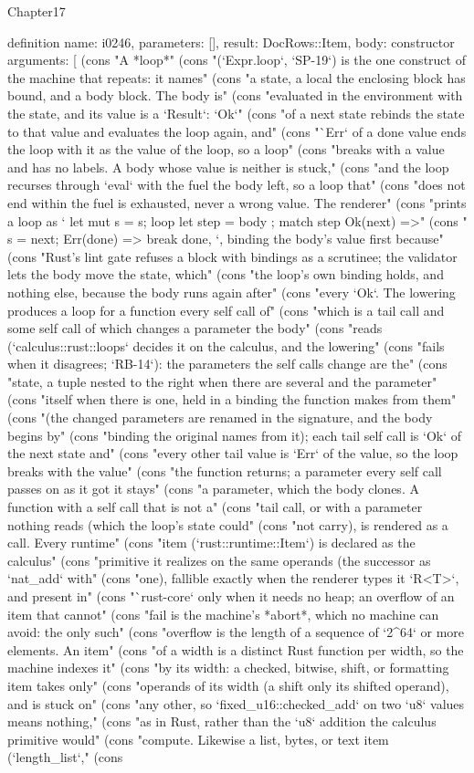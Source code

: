 \begin{lexlean}{Chapter17}
\begin{semanticmodule}
definition{
  name: i0246,
  parameters: [],
  result: DocRows::Item,
  body: constructor{
    arguments: [
      (cons "A *loop*" (cons "(`Expr.loop`, `SP-19`) is the one construct of the machine that repeats: it names" (cons "a state, a local the enclosing block has bound, and a body block. The body is" (cons "evaluated in the environment with the state, and its value is a `Result`: `Ok`" (cons "of a next state rebinds the state to that value and evaluates the loop again, and" (cons "`Err` of a done value ends the loop with it as the value of the loop, so a loop" (cons "breaks with a value and has no labels. A body whose value is neither is stuck," (cons "and the loop recurses through `eval` with the fuel the body left, so a loop that" (cons "does not end within the fuel is exhausted, never a wrong value. The renderer" (cons "prints a loop as `{ let mut s = s; loop { let step = { body }; match step { Ok(next) =>" (cons "{ s = next; } Err(done) => break done, } } }`, binding the body's value first because" (cons "Rust's lint gate refuses a block with bindings as a scrutinee; the validator lets the body move the state, which" (cons "the loop's own binding holds, and nothing else, because the body runs again after" (cons "every `Ok`. The lowering produces a loop for a function every self call of" (cons "which is a tail call and some self call of which changes a parameter the body" (cons "reads (`calculus::rust::loops` decides it on the calculus, and the lowering" (cons "fails when it disagrees; `RB-14`): the parameters the self calls change are the" (cons "state, a tuple nested to the right when there are several and the parameter" (cons "itself when there is one, held in a binding the function makes from them" (cons "(the changed parameters are renamed in the signature, and the body begins by" (cons "binding the original names from it); each tail self call is `Ok` of the next state and" (cons "every other tail value is `Err` of the value, so the loop breaks with the value" (cons "the function returns; a parameter every self call passes on as it got it stays" (cons "a parameter, which the body clones. A function with a self call that is not a" (cons "tail call, or with a parameter nothing reads (which the loop's state could" (cons "not carry), is rendered as a call. Every runtime" (cons "item (`rust::runtime::Item`) is declared as the calculus" (cons "primitive it realizes on the same operands (the successor as `nat_add` with" (cons "one), fallible exactly when the renderer types it `R<T>`, and present in" (cons "`rust-core` only when it needs no heap; an overflow of an item that cannot" (cons "fail is the machine's *abort*, which no machine can avoid: the only such" (cons "overflow is the length of a sequence of `2^64` or more elements. An item" (cons "of a width is a distinct Rust function per width, so the machine indexes it" (cons "by its width: a checked, bitwise, shift, or formatting item takes only" (cons "operands of its width (a shift only its shifted operand), and is stuck on" (cons "any other, so `fixed_u16::checked_add` on two `u8` values means nothing," (cons "as in Rust, rather than the `u8` addition the calculus primitive would" (cons "compute. Likewise a list, bytes, or text item (`length_list`," (cons }}
\end{semanticmodule}
\end{lexlean}
